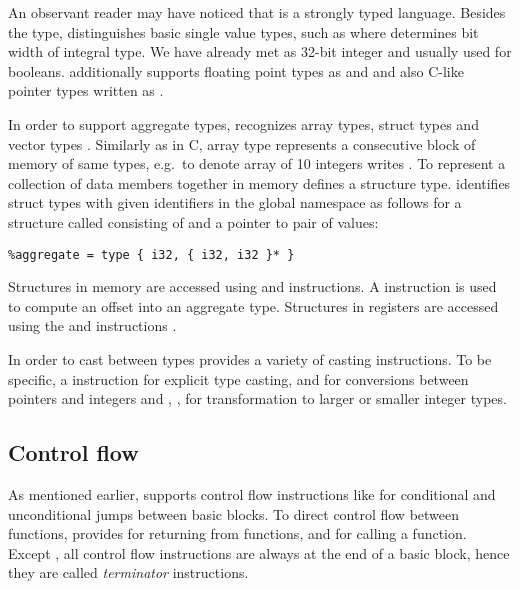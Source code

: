 An observant reader may have noticed that \LLVMIR is a strongly typed language.
Besides the  type, \LLVM distinguishes basic single value types, such as
 where  determines bit width of integral type. We have already met 
as 32-bit integer and  usually used for booleans.
\LLVM additionally supports floating point types as  and  and also C-like pointer types written as .

In order to support aggregate types, \LLVM recognizes array types, struct types
and vector types \cite{LLVM:langref}. Similarly as in C, array type represents a consecutive block
of memory of same types, e.g.~to denote array of 10 integers \LLVM writes
\code{[10 × i32]}. To represent a collection of data members together in memory \LLVM
defines a structure type. \LLVM identifies struct types with given
identifiers in the global namespace as follows for a structure called 
consisting of  and a pointer to pair of  values:

\begin{verbatim}
%aggregate = type { i32, { i32, i32 }* }
\end{verbatim}

Structures in memory are accessed using  and  instructions.
A  instruction is used to compute an offset into an aggregate type.
Structures in registers are accessed using the  and 
instructions \cite{LLVM:langref}.

In order to cast between types \LLVM provides a variety of casting instructions.
To be specific, a  instruction for explicit type casting,  and
 for conversions between pointers and integers and , ,
 for transformation to larger or smaller integer types.

\subsection{Control flow} \label{subsec:controlflow}

As mentioned earlier, \LLVM supports control flow instructions like  for
conditional and unconditional jumps between basic blocks. To direct control flow
between functions, \LLVM provides  for returning from functions,  and
 for calling a function. Except , all control flow instructions
are always at the end of a basic block, hence they are called \emph{terminator}
instructions.

